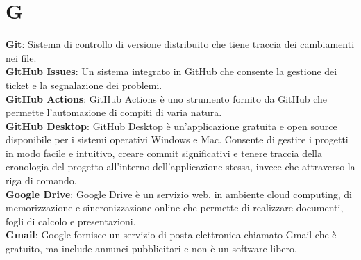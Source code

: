 \section*{G}
\textbf{Git}: Sistema di controllo di versione distribuito che tiene traccia dei cambiamenti nei file.\\
\textbf{GitHub Issues}: Un sistema integrato in GitHub che consente la gestione dei ticket e la segnalazione
dei problemi.\\
\textbf{GitHub Actions}: GitHub Actions è uno strumento fornito da GitHub che permette l’automazione di
compiti di varia natura.\\
\textbf{GitHub Desktop}: GitHub Desktop è un'applicazione gratuita e open source disponibile per i sistemi operativi Windows e Mac. Consente di gestire i progetti in modo facile e intuitivo, creare commit significativi e tenere traccia della cronologia del progetto all'interno dell'applicazione stessa, invece che attraverso la riga di comando.\\
\textbf{Google Drive}: Google Drive è un servizio web, in ambiente cloud computing, di memorizzazione e
sincronizzazione online che permette di realizzare documenti, fogli di calcolo e presentazioni.\\
\textbf{Gmail}: Google fornisce un servizio di posta elettronica chiamato Gmail che è gratuito, ma include annunci pubblicitari e non è un software libero.\\